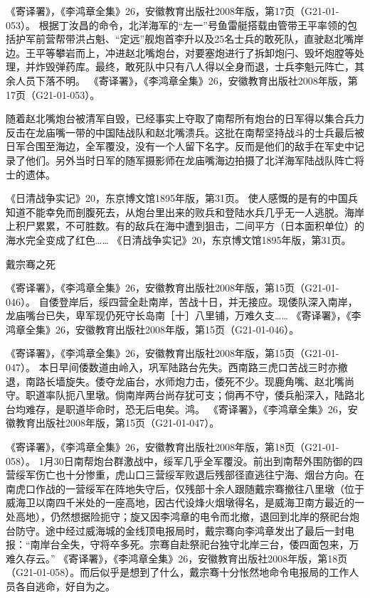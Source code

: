 \documentclass[12pt,UTF8]{ctexbook}
\begin{document}
《寄译署》，《李鸿章全集》26，安徽教育出版社2008年版，第17页（G21-01-053）。
根据丁汝昌的命令，北洋海军的“左一”号鱼雷艇搭载由管带王平率领的包括护军前营帮带洪占魁、“定远”舰炮首李升以及25名士兵的敢死队，直驶赵北嘴岸边。王平等攀岩而上，冲进赵北嘴炮台，对要塞炮进行了拆卸炮闩、毁坏炮膛等处理，并炸毁弹药库。最终，敢死队中只有八人得以全身而退，士兵李魁元阵亡，其余人员下落不明。 《寄译署》，《李鸿章全集》26，安徽教育出版社2008年版，第17页（G21-01-053）。

随着赵北嘴炮台被清军自毁，已经事实上夺取了南帮所有炮台的日军得以集合兵力反击在龙庙嘴一带的中国陆战队和赵北嘴溃兵。这批在南帮坚持战斗的士兵最后被日军合围至海边，全军覆没，没有一个人留下名字。反而是他们的敌手在军史中记录了他们。另外当时日军的随军摄影师在龙庙嘴海边拍摄了北洋海军陆战队阵亡将士的遗体。

《日清战争实记》20，东京博文馆1895年版，第31页。
使人感慨的是有的中国兵知道不能幸免而剖腹死去，从炮台里出来的败兵和登陆水兵几乎无一人逃脱。海岸上积尸累累，不可胜数。有的敌兵在海中遭到狙击，二间平方（日本面积单位）的海水完全变成了红色…… 《日清战争实记》20，东京博文馆1895年版，第31页。

戴宗骞之死

《寄译署》，《李鸿章全集》26，安徽教育出版社2008年版，第15页（G21-01-046）。
自倭登岸后，绥四营全赴南岸，苦战十日，并无接应。现倭队深入南岸，龙庙嘴台已失，卑军现仍死守长岛南［十］八里铺，万难久支…… 《寄译署》，《李鸿章全集》26，安徽教育出版社2008年版，第15页（G21-01-046）。

《寄译署》，《李鸿章全集》26，安徽教育出版社2008年版，第15页（G21-01-047）。
本日早间倭数道由岭入，巩军陆路台先失。西南路三虎口苦战三时亦撤退，南路长墙旋失。倭夺龙庙台，水师炮力击，倭死不少。现鹿角嘴、赵北嘴尚守。职道率队扼八里墩。倘南岸两台尚存犹可支；倘再不守，倭兵船深入，陆路北台均难存，是职道毕命时，恐无后电矣。鸿。 《寄译署》，《李鸿章全集》26，安徽教育出版社2008年版，第15页（G21-01-047）。

《寄译署》，《李鸿章全集》26，安徽教育出版社2008年版，第18页（G21-01-058）。
1月30日南帮炮台群激战中，绥军几乎全军覆没。前出到南帮外围防御的四营绥军伤亡也十分惨重，虎山口三营绥军败退后残部径直逃往宁海、烟台方向。在南虎口作战的一营绥军在阵地失守后，仅残部十余人跟随戴宗骞撤往八里墩（位于威海卫以南四千米处的一座高地，因古代设烽火烟墩得名，是威海卫南方最近的一处高地），仍然想据险扼守；旋又因李鸿章的电令而北撤，退回到北岸的祭祀台炮台防守。途中经过威海城的金线顶电报局时，戴宗骞向李鸿章发出了最后一封电报：“南岸台全失，守将卒多死。宗骞自赴祭祀台独守北岸三台，倭四面包来，万难久存云。” 《寄译署》，《李鸿章全集》26，安徽教育出版社2008年版，第18页（G21-01-058）。而后似乎是想到了什么，戴宗骞十分怅然地命令电报局的工作人员各自逃命，好自为之。
\end{document}
